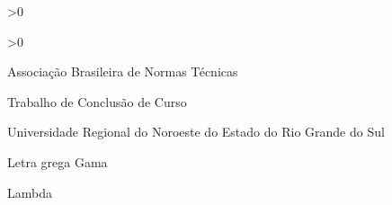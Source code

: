 \documentclass[
    12pt,               %
    oneside,            %
    a4paper,            %
    chapter=TITLE,      %
    section=TITLE,      %
    english,            %
    brazil              %
]{abntex2}
\begin{document}
\ifnum{}>0
    \listofquadros*
    \cleardoublepage
\fi

\ifnum{}>0
    \listoftables*
    \cleardoublepage
\fi

\begin{siglas}
    \item[ABNT] Associação Brasileira de Normas Técnicas
    \item[TCC] Trabalho de Conclusão de Curso
    \item[UNIJUÍ] Universidade Regional do Noroeste do Estado do Rio Grande do Sul
\end{siglas}

\begin{simbolos}
    \item[$ \Gamma $] Letra grega Gama
    \item[$ \Lambda $] Lambda
\end{simbolos}

\tableofcontents*
\cleardoublepage

\textual








\postextual



\begin{apendicesenv}

    
\end{apendicesenv}

\begin{anexosenv}

    
\end{anexosenv}

\end{document}
